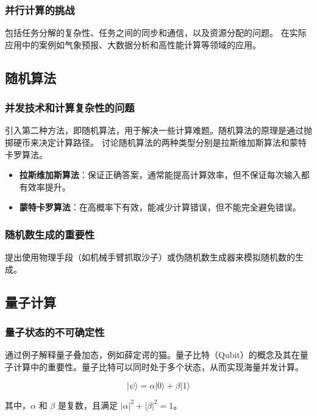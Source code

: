 \documentclass[UTF-8,a4paper,9pt]{article}
\begin{document}
\subsubsection{并行计算的挑战}

包括任务分解的复杂性、任务之间的同步和通信，以及资源分配的问题。
在实际应用中的案例如气象预报、大数据分析和高性能计算等领域的应用。

\subsection{随机算法}

\subsubsection{并发技术和计算复杂性的问题}

引入第二种方法，即随机算法，用于解决一些计算难题。随机算法的原理是通过抛掷硬币来决定计算路径。
讨论随机算法的两种类型分别是拉斯维加斯算法和蒙特卡罗算法。

\begin{itemize}
  \item \textbf{拉斯维加斯算法}：保证正确答案，通常能提高计算效率，但不保证每次输入都有效率提升。
  \item \textbf{蒙特卡罗算法}：在高概率下有效，能减少计算错误，但不能完全避免错误。
\end{itemize}

\subsubsection{随机数生成的重要性}

提出使用物理手段（如机械手臂抓取沙子）或伪随机数生成器来模拟随机数的生成。

\subsection{量子计算}

\subsubsection{量子状态的不可确定性}

通过例子解释量子叠加态，例如薛定谔的猫。量子比特（Qubit）的概念及其在量子计算中的重要性。量子比特可以同时处于多个状态，从而实现海量并发计算。

\[
  |\psi\rangle = \alpha|0\rangle + \beta|1\rangle
\]

其中，$\alpha$ 和 $\beta$ 是复数，且满足 $|\alpha|^2 + |\beta|^2 = 1$。
\end{document}
